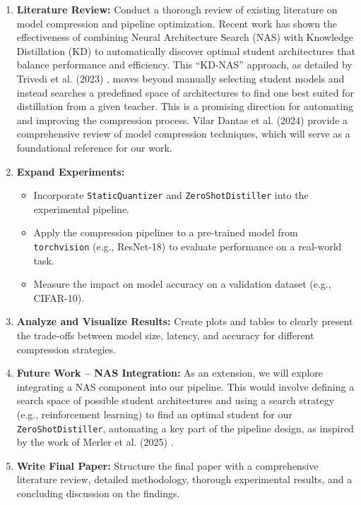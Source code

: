 \documentclass[sigconf]{acmart}
\begin{document}
\begin{enumerate}
    \item \textbf{Literature Review:} Conduct a thorough review of existing literature on model compression and pipeline optimization. Recent work has shown the effectiveness of combining Neural Architecture Search (NAS) with Knowledge Distillation (KD) to automatically discover optimal student architectures that balance performance and efficiency. This ``KD-NAS'' approach, as detailed by Trivedi et al. (2023) \cite{trivedi2023neural}, moves beyond manually selecting student models and instead searches a predefined space of architectures to find one best suited for distillation from a given teacher. This is a promising direction for automating and improving the compression process. Vilar Dantas et al. (2024) \cite{vilar2024comprehensive} provide a comprehensive review of model compression techniques, which will serve as a foundational reference for our work.
    \item \textbf{Expand Experiments:}
    \begin{itemize}
        \item Incorporate \texttt{StaticQuantizer} and \texttt{ZeroShotDistiller} into the experimental pipeline.
        \item Apply the compression pipelines to a pre-trained model from \texttt{torchvision} (e.g., ResNet-18) to evaluate performance on a real-world task.
        \item Measure the impact on model accuracy on a validation dataset (e.g., CIFAR-10).
    \end{itemize}
    \item \textbf{Analyze and Visualize Results:} Create plots and tables to clearly present the trade-offs between model size, latency, and accuracy for different compression strategies.
    \item \textbf{Future Work -- NAS Integration:} As an extension, we will explore integrating a NAS component into our pipeline. This would involve defining a search space of possible student architectures and using a search strategy (e.g., reinforcement learning) to find an optimal student for our \texttt{ZeroShotDistiller}, automating a key part of the pipeline design, as inspired by the work of Merler et al. (2025) \cite{merler2025neural}.
    \item \textbf{Write Final Paper:} Structure the final paper with a comprehensive literature review, detailed methodology, thorough experimental results, and a concluding discussion on the findings.
\end{enumerate}



\end{document}
